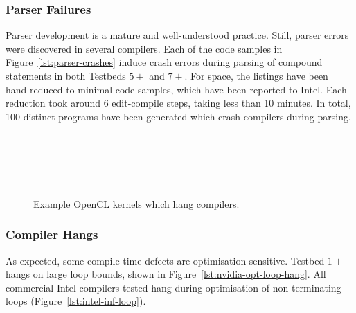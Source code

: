 \subsubsection{Parser Failures}

Parser development is a mature and well-understood practice. Still, parser errors were discovered in several compilers. Each of the code samples in Figure~\ref{lst:parser-crashes} induce crash errors during parsing of compound statements in both Testbeds $5\pm$ and $7\pm$. For space, the listings have been hand-reduced to minimal code samples, which have been reported to Intel. Each reduction took around 6 edit-compile steps, taking less than 10 minutes. In total, 100 distinct programs have been generated which crash compilers during parsing.

\begin{figure}
  \centering %
  \\%
  \\%
  \\%
  \\%
  \caption[Example kernels which hang compilers]{%
    Example OpenCL kernels which hang compilers.%
  }%
  \label{lst:compiler-hangs}
\end{figure}

\subsubsection{Compiler Hangs}

As expected, some compile-time defects are optimisation sensitive. Testbed $1+$ hangs on large loop bounds, shown in Figure~\ref{lst:nvidia-opt-loop-hang}. All commercial Intel compilers  tested hang during optimisation of non-terminating loops (Figure~\ref{lst:intel-inf-loop}).

